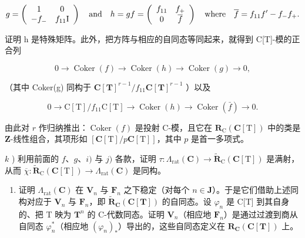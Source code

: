 \[
g = \left( \begin{array}{c c} 1 & 0 \\ - f _ {-} & f _ {1 1} \mathrm{I} \end{array} \right) \quad \text {and} \quad h = g f = \left( \begin{array}{c c} f _ {1 1} & f _ {+} \\ 0 & \overline {{f}} \end{array} \right) \quad \text {where} \quad \overline {{f}} = f _ {1 1} f ^ {\prime} - f _ {-} f _ {+}.
\]

证明 h 是特殊矩阵。此外，把方阵与相应的自同态等同起来，就得到 C{[}T{]}-模的正合列

\[
0 \rightarrow \operatorname{Coker} (f) \rightarrow \operatorname{Coker} (h) \rightarrow \operatorname{Coker} (g) \rightarrow 0,
\]

（其中 Coker(g) 同构于 \(\mathbf{C}[\mathbf{T}]^{r - 1} / f_{11}\mathbf{C}[\mathbf{T}]^{r - 1}\) ）以及

\[
0 \rightarrow \mathrm{C} [ \mathrm{T} ] / f _ {1 1} \mathrm{C} [ \mathrm{T} ] \rightarrow \operatorname{Coker} (h) \rightarrow \operatorname{Coker} (\bar {f}) \rightarrow 0.
\]

由此对 \(r\) 作归纳推出：\(\operatorname{Coker}(f)\) 是投射 C-模，且它在 \(\mathbf{R}_{\mathrm{C}}(\mathbf{C}[\mathrm{T}])\) 中的类是 \(\mathbf{Z}\)-线性组合，其项形如 \([\mathbf{C}[\mathrm{T}] / p\mathbf{C}[\mathrm{T}]]\)，其中 \(p\) 是首一多项式。

  \(k\) ) 利用前面的 \(f\)、\(g\)、\(i)\) 与 \(j)\) 各款，证明 \(\tau : \Lambda_{\mathrm{rat}}(\mathbf{C}) \to \tilde{\mathbf{R}}_{\mathrm{C}}(\mathbf{C}[\mathrm{T}])\) 是满射，从而 \(\overline{\chi} : \tilde{\mathbf{R}}_{\mathrm{C}}(\mathbf{C}[\mathrm{T}]) \to \Lambda_{\mathrm{rat}}(\mathbf{C})\) 是同构。

\begin{enumerate}
\def\labelenumi{\alph{enumi})}
\setcounter{enumi}{11}
\tightlist
\item
  证明 \(\Lambda_{\mathrm{rat}}(\mathbf{C})\) 在 \(\mathbf{V}_n\) 与 \(\mathbf{F}_n\) 之下稳定（对每个 \(n \in \mathbf{J}\)）。于是它们借助上述同构对应于 \(\mathbf{V}_n\) 与 \(\mathbf{F}_n\)，即 \(\tilde{\mathbf{R}}_{\mathbf{C}}(\mathbf{C}[\mathbf{T}])\) 的自同态。设 \(\varphi_n\) 是 C{[}T{]} 到其自身的、把 T 映为 \(\mathbf{T}^n\) 的 C-代数同态。证明 \(\mathbf{V}_n\)（相应地 \(\mathbf{F}_n\)）是通过过渡到商从自同态 \(\varphi_n^*\)（相应地 \((\varphi_n)_*\)）导出的，这些自同态定义在 \(\mathbf{R}_{\mathbf{C}}(\mathbf{C}[\mathbf{T}])\) 上。
\end{enumerate}

